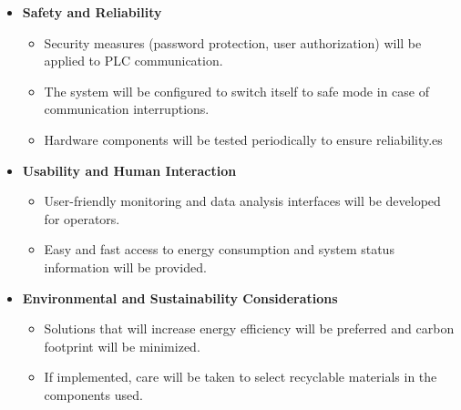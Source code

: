 \begin{itemize}
    \item \textbf{Safety and Reliability}
    \begin{itemize}
        \item Security measures (password protection, user authorization) will be applied to PLC communication.
        \item The system will be configured to switch itself to safe mode in case of communication interruptions.
        \item Hardware components will be tested periodically to ensure reliability.es
    \end{itemize}

    \item \textbf{Usability and Human Interaction}
    \begin{itemize}
        \item User-friendly monitoring and data analysis interfaces will be developed for operators.
        \item Easy and fast access to energy consumption and system status information will be provided.
    \end{itemize}

    \item \textbf{Environmental and Sustainability Considerations}
    \begin{itemize}
        \item Solutions that will increase energy efficiency will be preferred and carbon footprint will be minimized.
        \item If implemented, care will be taken to select recyclable materials in the components used.
    \end{itemize}
\end{itemize}
